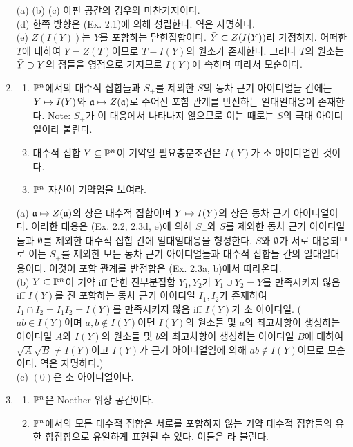 \begin{enumerate}[label=\tb{2.\arabic*.},itemindent=0mm,itemsep=4mm]
		\sol (a) (b) (c) 아핀 공간의 경우와 마찬가지이다.\\
		(d) 한쪽 방향은 (Ex. 2.1)에 의해 성립한다. 역은 자명하다.\\
		(e) $Z(I(Y))$는 $Y$를 포함하는 닫힌집합이다. $\bar Y\subset Z(I(Y))$라 가정하자.
		어떠한 $T$에 대하여 $\bar Y=Z(T)$이므로 $T-I(Y)$의 원소가 존재한다.
		그러나 $T$의 원소는 $\bar Y\supset Y$의 점들을 영점으로 가지므로 $I(Y)$에 속하며 따라서 모순이다.
		\item \begin{enumerate}[label=(\alph*)]
			\item $\mathbb{P}^n$에서의 대수적 집합들과 $S_+$를 제외한 $S$의 동차 근기 아이디얼들 간에는
			$Y\mapsto I(Y)$와 $\mathfrak{a}\mapsto Z(\mathfrak{a})$로 주어진 포함 관계를 반전하는 일대일대응이 존재한다.
			Note: $S_+$가 이 대응에서 나타나지 않으므로 이는 때로는 $S$의  극대 아이디얼이라 불린다.
			\item 대수적 집합 $Y\subseteq\mathbb{P}^n$이 기약일 필요충분조건은 $I(Y)$가 소 아이디얼인 것이다.
			\item $\mathbb{P}^n$ 자신이 기약임을 보여라.
		\end{enumerate}
		\sol (a) $\mathfrak{a}\mapsto Z(\mathfrak{a})$의 상은 대수적 집합이며 $Y\mapsto I(Y)$의 상은 동차 근기 아이디얼이다.
		이러한 대응은 (Ex. 2.2, 2.3d, e)에 의해 $S_+$와 $S$를 제외한 동차 근기 아이디얼들과
		$\emptyset$를 제외한 대수적 집합 간에 일대일대응을 형성한다.
		$S$와 $\emptyset$가 서로 대응되므로 이는 $S_+$를 제외한 모든 동차 근기 아이디얼들과 대수적 집합들 간의 일대일대응이다.
		이것이 포함 관계를 반전함은 (Ex. 2.3a, b)에서 따라온다.\\
		(b) $Y\subseteq\mathbb{P}^n$이 기약 iff 닫힌 진부분집합 $Y_1,Y_2$가 $Y_1\cup Y_2=Y$를 만족시키지 않음
		iff $I(Y)$를 진 포함하는 동차 근기 아이디얼 $I_1,I_2$가 존재하여 $I_1\cap I_2=I_1I_2=I(Y)$를 만족시키지 않음
		iff $I(Y)$가 소 아이디얼. ($ab\in I(Y)$이며 $a,b\notin I(Y)$이면
		$I(Y)$의 원소들 및 $a$의 최고차항이 생성하는 아이디얼 $A$와
		$I(Y)$의 원소들 및 $b$의 최고차항이 생성하는 아이디얼 $B$에 대하여
		$\sqrt A\sqrt B\ne I(Y)$이고 $I(Y)$가 근기 아이디얼임에 의해 $ab\notin I(Y)$이므로 모순이다. 역은 자명하다.)\\
		(c) $(0)$은 소 아이디얼이다.
		\item \begin{enumerate}[label=(\alph*)]
			\item $\mathbb{P}^n$은 Noether 위상 공간이다.
			\item $\mathbb{P}^n$에서의 모든 대수적 집합은 서로를 포함하지 않는 기약 대수적 집합들의
			유한 합집합으로 유일하게 표현될 수 있다. 이들은 라 불린다.

\end{enumerate}
\end{enumerate}

